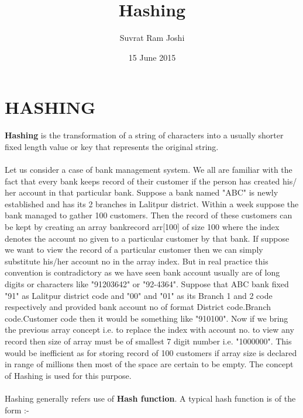 \documentclass[12pt,a4paper]{article}
\begin{document}
\title{Hashing}
\author{Suvrat Ram Joshi}
\date{15 June 2015}
\maketitle
\thispagestyle{empty}

\newpage
\tableofcontents
\thispagestyle{empty}
\cleardoublepage{}

\newpage
{}
\setcounter{page}{1}
\section{HASHING}

\textbf{Hashing} is the transformation of a string of characters into a usually shorter fixed length value or key that represents the original string. \\ \\
Let us consider a case of bank management system. We all are familiar with the fact that every bank keeps record of their customer if the person has created his/ her account in that particular bank. Suppose a bank named "ABC" is newly established and has its 2 branches in Lalitpur district. Within a week suppose the bank managed to gather 100 customers. Then the record of these customers can be kept by creating an array bankrecord arr[100] of size 100 where the index denotes the account no given to a particular customer by that bank. If suppose we want to view the record of a particular customer then we can simply substitute his/her account no in the array index. But in real practice this convention is contradictory as we have seen bank account usually are of long digits or characters like "91203642" or "92-4364". Suppose that ABC bank fixed "91" as Lalitpur district code and "00" and "01" as its Branch 1 and 2 code respectively and provided bank account no of format District code.Branch code.Customer code then it would be something like "910100". Now if we bring the previous array concept i.e. to replace the index with account no. to view any record then size of array must be of smallest 7 digit number i.e. "1000000". This would be inefficient as for storing record of 100 customers if array size is declared in range of millions then most of the space are certain to be empty. The concept of Hashing is used for this purpose. \\ \\
Hashing generally refers use of \textbf{Hash function}. A typical hash function is of the form :-
\end{document}
